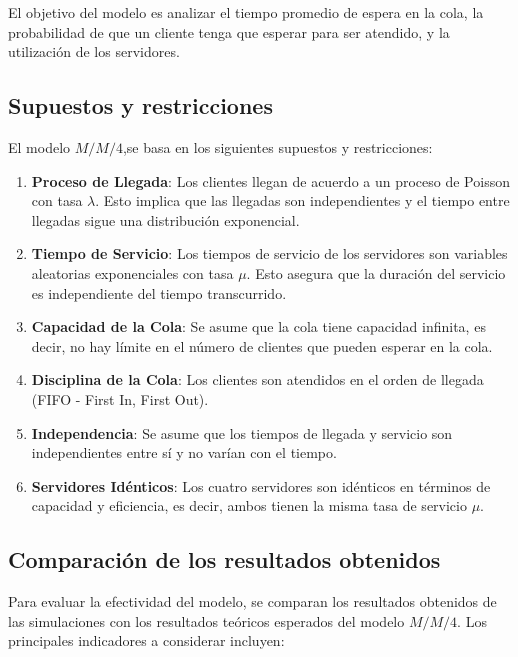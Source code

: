 \documentclass[10pt,twocolumn]{article}
\begin{document}
El objetivo del modelo es analizar el tiempo promedio de espera en la cola, la probabilidad de que un cliente tenga que esperar para ser atendido, y la utilización de los servidores.

\subsection{Supuestos y restricciones}

El modelo $M/M/4$,se basa en los siguientes supuestos y restricciones:

\begin{enumerate}
	\item \textbf{Proceso de Llegada}: Los clientes llegan de acuerdo a un proceso de Poisson con tasa $\lambda$. Esto implica que las llegadas son independientes y el tiempo entre llegadas sigue una distribución exponencial.
	\item \textbf{Tiempo de Servicio}: Los tiempos de servicio de los servidores son variables aleatorias exponenciales con tasa $\mu$. Esto asegura que la duración del servicio es independiente del tiempo transcurrido.
	\item \textbf{Capacidad de la Cola}: Se asume que la cola tiene capacidad infinita, es decir, no hay límite en el número de clientes que pueden esperar en la cola.
	\item \textbf{Disciplina de la Cola}: Los clientes son atendidos en el orden de llegada (FIFO - First In, First Out).
	\item \textbf{Independencia}: Se asume que los tiempos de llegada y servicio son independientes entre sí y no varían con el tiempo.
	\item \textbf{Servidores Idénticos}: Los cuatro servidores son idénticos en términos de capacidad y eficiencia, es decir, ambos tienen la misma tasa de servicio $\mu$.
\end{enumerate}

\subsection{Comparación de los resultados obtenidos}

Para evaluar la efectividad del modelo, se comparan los resultados obtenidos de las simulaciones con los resultados teóricos esperados del modelo $M/M/4$. Los principales indicadores a considerar incluyen:
\end{document}
